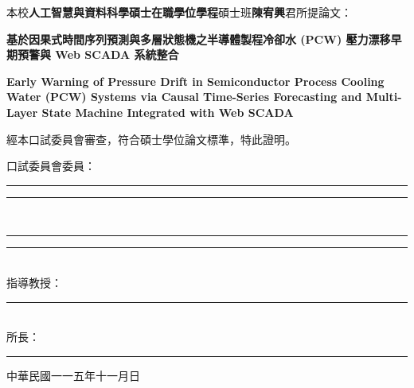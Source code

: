 \documentclass[fontset=none, a4paper, 12pt]{ctexart}
\begin{document}
{\fontsize{14}{22}\selectfont
本校\textbf{人工智慧與資料科學碩士在職學位學程}碩士班\textbf{陳宥興}君所提論文：\par
\begin{center}
\textbf{基於因果式時間序列預測與多層狀態機之半導體製程冷卻水 (PCW) 壓力漂移早期預警與 Web SCADA 系統整合}\par
\textbf{Early Warning of Pressure Drift in Semiconductor Process Cooling Water (PCW) Systems via Causal Time-Series Forecasting and Multi-Layer State Machine Integrated with Web SCADA}\par
\end{center}
經本口試委員會審查，符合碩士學位論文標準，特此證明。\par}

\vspace{2.0cm}

{\fontsize{14}{20}\selectfont
\begin{flushleft}
口試委員會委員：\\[1.5cm]
\rule{6cm}{0.5pt}\hspace{1.5cm}\rule{6cm}{0.5pt}\\[1.5cm]
\rule{6cm}{0.5pt}\hspace{1.5cm}\rule{6cm}{0.5pt}\\[1.5cm]
指導教授：\rule{8cm}{0.5pt}\\[1.2cm]
所\hspace{0.8cm}長：\rule{8cm}{0.5pt}
\end{flushleft}
}

\vfill
\begin{center}
{\fontsize{14}{18}\selectfont 中\hspace{0.5cm}華\hspace{0.5cm}民\hspace{0.5cm}國\hspace{0.5cm}一一五年十一月\hspace{0.5cm}日\par}
\end{center}
\end{document}
